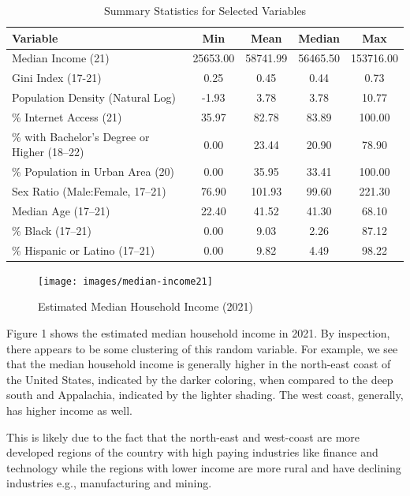 \documentclass[
]{article}
\begin{document}
\begin{longtable}[t]{lcccc}
\caption{\label{tab:unnamed-chunk-2}Summary Statistics for Selected Variables}\\
\toprule
Variable & Min & Mean & Median & Max\\
\midrule
Median Income (21) & 25653.00 & 58741.99 & 56465.50 & 153716.00\\
Gini Index (17-21) & 0.25 & 0.45 & 0.44 & 0.73\\
Population Density (Natural Log) & -1.93 & 3.78 & 3.78 & 10.77\\
\% Internet Access (21) & 35.97 & 82.78 & 83.89 & 100.00\\
\% with Bachelor's Degree or Higher (18–22) & 0.00 & 23.44 & 20.90 & 78.90\\
\addlinespace
\% Population in Urban Area (20) & 0.00 & 35.95 & 33.41 & 100.00\\
Sex Ratio (Male:Female, 17–21) & 76.90 & 101.93 & 99.60 & 221.30\\
Median Age (17–21) & 22.40 & 41.52 & 41.30 & 68.10\\
\% Black (17–21) & 0.00 & 9.03 & 2.26 & 87.12\\
\% Hispanic or Latino (17–21) & 0.00 & 9.82 & 4.49 & 98.22\\
\bottomrule
\end{longtable}

\newpage

\begin{figure}[H]

{\centering \texttt{[image: images/median-income21]} 

}

\caption{Estimated Median Household Income (2021)}\label{fig:unnamed-chunk-3}
\end{figure}

Figure 1 shows the estimated median household income in 2021. By
inspection, there appears to be some clustering of this random variable.
For example, we see that the median household income is generally higher
in the north-east coast of the United States, indicated by the darker
coloring, when compared to the deep south and Appalachia, indicated by
the lighter shading. The west coast, generally, has higher income as
well.

This is likely due to the fact that the north-east and west-coast are
more developed regions of the country with high paying industries like
finance and technology while the regions with lower income are more
rural and have declining industries e.g., manufacturing and mining.
\end{document}
